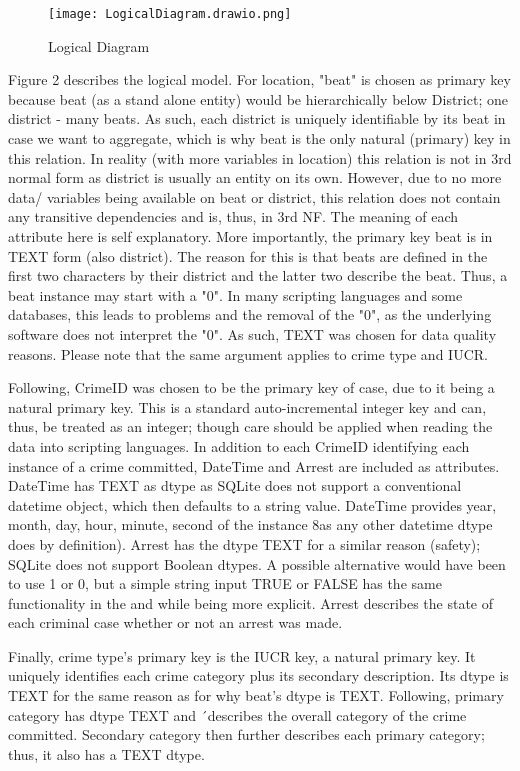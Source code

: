 \documentclass[a4paper]{article}
\begin{document}
\begin{figure}[htp]
		\centering
		\texttt{[image: LogicalDiagram.drawio.png]}
         \small
         \caption{Logical Diagram}
\end{figure}

Figure 2 describes the logical model. For location, "beat" is chosen as primary key because beat (as a stand alone entity) would be hierarchically below District; one district - many beats. As such, each district is uniquely identifiable by its beat in case we want to aggregate, which is why beat is the only natural (primary) key in this relation. In reality (with more variables in location) this relation is not in 3rd normal form as district is usually an entity on its own. However, due to no more data/ variables being available on beat or district, this relation does not contain any transitive dependencies and is, thus, in 3rd NF. The meaning of each attribute here is self explanatory. More importantly, the primary key beat is in TEXT form (also district). The reason for this is that beats are defined in the first two characters by their district and the latter two describe the beat. Thus, a beat instance may start with a "0". In many scripting languages and some databases, this leads to problems and the removal of the "0", as the underlying software does not interpret the "0". As such, TEXT was chosen for data quality reasons. Please note that the same argument applies to crime type and IUCR. 

\indent Following, CrimeID was chosen to be the primary key of case, due to it being a natural primary key. This is a standard auto-incremental integer key and can, thus, be treated as an integer; though care should be applied when reading the data into scripting languages. In addition to each CrimeID identifying each instance of a crime committed, DateTime and Arrest are included as attributes. DateTime has TEXT as dtype as SQLite does not support a conventional datetime object, which then defaults to a string value. DateTime provides year, month, day, hour, minute, second of the instance 8as any other datetime dtype does by definition). Arrest has the dtype TEXT for a similar reason (safety); SQLite does not support Boolean dtypes. A possible alternative would have been to use 1 or 0, but a simple string input TRUE or FALSE has the same functionality in the and while being more explicit. Arrest describes the state of each criminal case whether or not an arrest was made. 


\indent Finally, crime type's primary key is the IUCR key, a natural primary key. It uniquely identifies each crime category plus its secondary description. Its dtype is TEXT for the same reason as for why beat's dtype is TEXT. Following, primary category has dtype TEXT and ´describes the overall category of the crime committed. Secondary category then further describes each primary category; thus, it also has a TEXT dtype. 
\end{document}
